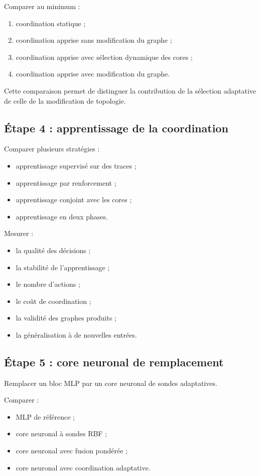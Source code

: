 \documentclass[11pt,a4paper]{article}
\begin{document}
Comparer au minimum :

\begin{enumerate}
  \item coordination statique ;
  \item coordination apprise sans modification du graphe ;
  \item coordination apprise avec sélection dynamique des cores ;
  \item coordination apprise avec modification du graphe.
\end{enumerate}

Cette comparaison permet de distinguer la contribution de la
sélection adaptative de celle de la modification de topologie.

\subsection{Étape 4 : apprentissage de la coordination}

Comparer plusieurs stratégies :
\begin{itemize}
  \item apprentissage supervisé sur des traces ;
  \item apprentissage par renforcement ;
  \item apprentissage conjoint avec les cores ;
  \item apprentissage en deux phases.
\end{itemize}

Mesurer :
\begin{itemize}
  \item la qualité des décisions ;
  \item la stabilité de l'apprentissage ;
  \item le nombre d'actions ;
  \item le coût de coordination ;
  \item la validité des graphes produits ;
  \item la généralisation à de nouvelles entrées.
\end{itemize}

\subsection{Étape 5 : core neuronal de remplacement}

Remplacer un bloc MLP par un core neuronal de sondes adaptatives.

Comparer :
\begin{itemize}
  \item MLP de référence ;
  \item core neuronal à sondes RBF ;
  \item core neuronal avec fusion pondérée ;
  \item core neuronal avec coordination adaptative.
\end{itemize}
\end{document}
